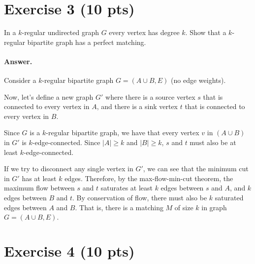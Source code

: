 \documentclass[a4paper]{article}
\begin{document}









\section*{Exercise 3 (10 pts)}

In a $k$-regular undirected graph $G$ every vertex has degree $k$. Show that a $k$-regular bipartite graph has a perfect matching.

\paragraph{Answer.}

Consider a $k$-regular bipartite graph $G = (A \cup B, E)$ (no edge weights).

Now, let's define a new graph $G'$ where there is a source vertex $s$ that is connected to every vertex in $A$, and there is a sink vertex $t$ that is connected to every vertex in $B$.

Since $G$ is a $k$-regular bipartite graph, we have that every vertex $v$ in $(A \cup B)$ in $G'$ is $k$-edge-connected. Since $|A| \ge k$ and $|B| \ge k$, $s$ and $t$ must also be at least $k$-edge-connected.

If we try to disconnect any single vertex in $G'$, we can see that the minimum cut in $G'$ has at least $k$ edges. Therefore, by the max-flow-min-cut theorem, the maximum flow between $s$ and $t$ saturates at least $k$ edges between $s$ and $A$, and $k$ edges between $B$ and $t$. By conservation of flow, there must also be $k$ saturated edges between $A$ and $B$. That is, there is a matching $M$ of size $k$ in graph $G = (A \cup B, E)$.

\section*{Exercise 4 (10 pts)}
\end{document}
